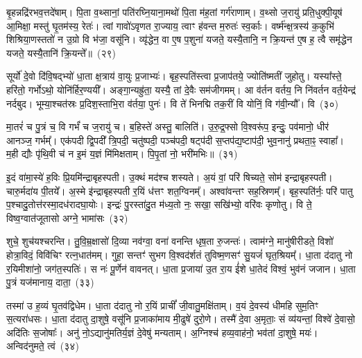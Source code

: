 बृ॒हन्नद्रि॑रभव॒त्तदे॑षाम्। पि॒ता व॒थ्सानां॒ पति॑रघ्नि॒याना॒मथो॑ पि॒ता म॑ह॒तां गर्ग॑राणाम्। व॒थ्सो ज॒रायु॑ प्रति॒धुक्पी॒यूष॑ आ॒मिक्षा॒ मस्तु॑ घृ॒तम॑स्य॒ रेतः॑। त्वां गावो॑\-ऽवृणत रा॒ज्याय॒ त्वाꣳ ह॑वन्त म॒रुतः॑ स्व॒र्काः। वर्ष्म॑न्क्ष॒त्रस्य॑ क॒कुभि॑ शिश्रिया॒णस्ततो॑ न उ॒ग्रो वि भ॑जा॒ वसू॑नि। व्यृ॑द्धेन॒ वा ए॒ष प॒शुना॑ यजते॒ यस्यै॒तानि॒ न क्रि॒यन्त॑ ए॒ष ह॒ त्वै समृ॑द्धेन यजते॒ यस्यै॒तानि॑ क्रि॒यन्ते᳚॥~(२९)

{\anuvakamend[{पू॒षा क्रि॒यन्त॑ ए॒षो᳚\-ऽष्टौ च॑}]}%

सूर्यो॑ दे॒वो दि॑वि॒षद्भ्यो॑ धा॒ता क्ष॒त्राय॑ वा॒युः प्र॒जाभ्यः॑। बृह॒स्पति॑स्त्वा प्र॒जा\-प॑तये॒ ज्योति॑ष्मतीं जुहोतु। यस्या᳚स्ते॒ हरि॑तो॒ गर्भो\-ऽथो॒ योनि॑र्\mbox{}हिर॒ण्ययी᳚। अङ्गा॒न्यह्रु॑ता॒ यस्यै॒ तां दे॒वैः सम॑जीगमम्। आ व॑र्तन वर्तय॒ नि नि॑वर्तन वर्त॒येन्द्र॑ नर्दबुद। भूम्या॒श्चत॑स्रः प्र॒दिश॒स्ताभि॒रा व॑र्तया॒ पुनः॑। वि ते॑ भिनद्मि तक॒रीं वि योनिं॒ वि ग॑वी॒न्यौ᳚। वि~(३०)

मा॒तरं॑ च पु॒त्रं च॒ वि गर्भं॑ च ज॒रायु॑ च। ब॒हिस्ते॑ अस्तु॒ बालिति॑। उ॒रु॒द्र॒फ्सो वि॒श्वरू॑प॒ इन्दुः॒ पव॑मानो॒ धीर॑ आनञ्ज॒ गर्भम्᳚। एक॑पदी द्वि॒पदी᳚ त्रि॒पदी॒ चतु॑ष्पदी॒ पञ्च॑पदी॒ षट्प॑दी स॒प्तप॑द्य॒ष्टाप॑दी॒ भुव॒नानु॑ प्रथता॒ꣴ॒ स्वाहा᳚। म॒ही द्यौः पृ॑थि॒वी च॑ न इ॒मं य॒ज्ञं मि॑मिक्षताम्। पि॒पृ॒तां नो॒ भरी॑मभिः॥~(३१)

{\anuvakamend[{ग॒वी॒न्यौ॑ वि चतु॑श्चत्वारिꣳशच्च}]}%

इ॒दं वा॑मा॒स्ये॑ ह॒विः प्रि॒यमि॑न्द्राबृहस्पती। उ॒क्थं मद॑श्च शस्यते। अ॒यं वां॒ परि॑ षिच्यते॒ सोम॑ इन्द्राबृहस्पती। चारु॒र्मदा॑य पी॒तये᳚। अ॒स्मे इ॑न्द्राबृहस्पती र॒यिं ध॑त्तꣳ शत॒ग्विनम्᳚। अश्वा॑वन्तꣳ सह॒स्रिणम्᳚। बृह॒स्पति॑र्नः॒ परि॑ पातु प॒श्चादु॒तोत्त॑रस्मा॒दध॑रादघा॒योः। इन्द्रः॑ पु॒रस्ता॑दु॒त म॑ध्य॒तो नः॒ सखा॒ सखि॑भ्यो॒ वरि॑वः कृणोतु। वि ते॒ विष्व॒ग्वात॑जूतासो अग्ने॒ भामा॑सः~(३२)

शुचे॒ शुच॑यश्चरन्ति। तु॒वि॒म्र॒क्षासो॑ दि॒व्या नव॑ग्वा॒ वना॑ वनन्ति धृष॒ता रु॒जन्तः॑। त्वाम॑ग्ने॒ मानु॑षीरीडते॒ विशो॑ होत्रा॒विदं॒ विवि॑चिꣳ रत्न॒धात॑मम्। गुहा॒ सन्तꣳ॑ सुभग वि॒श्वद॑र्\mbox{}शतं तुविष्म॒णसꣳ॑ सु॒यजं॑ घृत॒श्रियम्᳚। धा॒ता द॑दातु नो र॒यिमीशा॑नो॒ जग॑त॒स्पतिः॑। स नः॑ पू॒र्णेन॑ वावनत्। धा॒ता प्र॒जाया॑ उ॒त रा॒य ई॑शे धा॒तेदं विश्वं॒ भुव॑नं जजान। धा॒ता पु॒त्रं यज॑मानाय॒ दाता॒~(३३)

तस्मा॑ उ ह॒व्यं घृ॒तव॑द्विधेम। धा॒ता द॑दातु नो र॒यिं प्राचीं᳚ जी॒वातु॒मक्षि॑ताम्। व॒यं दे॒वस्य॑ धीमहि सुम॒तिꣳ स॒त्यरा॑धसः। धा॒ता द॑दातु दा॒शुषे॒ वसू॑नि प्र॒जाका॑माय मी॒ढुषे॑ दुरो॒णे। तस्मै॑ दे॒वा अ॒मृताः॒ सं व्य॑यन्तां॒ विश्वे॑ दे॒वासो॒ अदि॑तिः स॒जोषाः᳚। अनु॑ नो॒\-ऽद्यानु॑मतिर्य॒ज्ञं दे॒वेषु॑ मन्यताम्। अ॒ग्निश्च॑ हव्य॒वाह॑नो॒ भव॑तां दा॒शुषे॒ मयः॑। अन्विद॑नुमते॒ त्वं~(३४)

